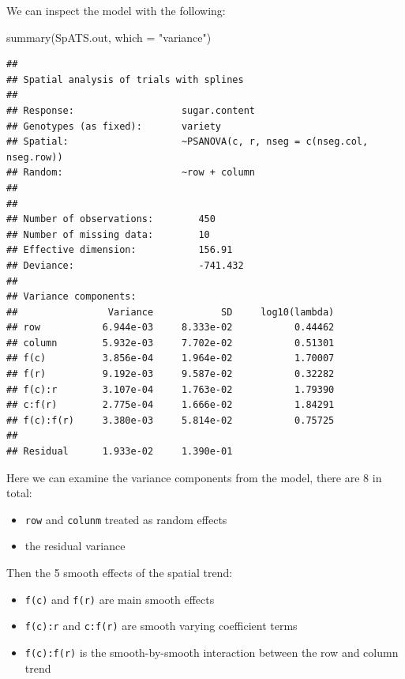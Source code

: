 \documentclass[
]{book}
\newenvironment{Shaded}{\begin{snugshade}}{\end{snugshade}}
\newcommand{\AttributeTok}[1]{\textcolor[rgb]{0.77,0.63,0.00}{#1}}
\newcommand{\FunctionTok}[1]{\textcolor[rgb]{0.00,0.00,0.00}{#1}}
\newcommand{\NormalTok}[1]{#1}
\newcommand{\StringTok}[1]{\textcolor[rgb]{0.31,0.60,0.02}{#1}}
\providecommand{\tightlist}{%
  \setlength{\itemsep}{0pt}\setlength{\parskip}{0pt}}
\begin{document}
We can inspect the model with the following:

\begin{Shaded}
\begin{Highlighting}[]
\FunctionTok{summary}\NormalTok{(SpATS.out, }\AttributeTok{which =} \StringTok{"variance"}\NormalTok{)}
\end{Highlighting}
\end{Shaded}

\begin{verbatim}
## 
## Spatial analysis of trials with splines 
## 
## Response:                   sugar.content
## Genotypes (as fixed):       variety   
## Spatial:                    ~PSANOVA(c, r, nseg = c(nseg.col, nseg.row))
## Random:                     ~row + column
## 
## 
## Number of observations:        450
## Number of missing data:        10
## Effective dimension:           156.91
## Deviance:                      -741.432
## 
## Variance components:
##                Variance            SD     log10(lambda)
## row           6.944e-03     8.333e-02           0.44462
## column        5.932e-03     7.702e-02           0.51301
## f(c)          3.856e-04     1.964e-02           1.70007
## f(r)          9.192e-03     9.587e-02           0.32282
## f(c):r        3.107e-04     1.763e-02           1.79390
## c:f(r)        2.775e-04     1.666e-02           1.84291
## f(c):f(r)     3.380e-03     5.814e-02           0.75725
##                                                        
## Residual      1.933e-02     1.390e-01
\end{verbatim}

Here we can examine the variance components from the model, there are 8 in total:

\begin{itemize}
\tightlist
\item
  \texttt{row} and \texttt{colunm} treated as random effects
\item
  the residual variance
\end{itemize}

Then the 5 smooth effects of the spatial trend:

\begin{itemize}
\tightlist
\item
  \texttt{f(c)} and \texttt{f(r)} are main smooth effects
\item
  \texttt{f(c):r} and \texttt{c:f(r)} are smooth varying coefficient terms
\item
  \texttt{f(c):f(r)} is the smooth-by-smooth interaction between the row and column trend
\end{itemize}
\end{document}

